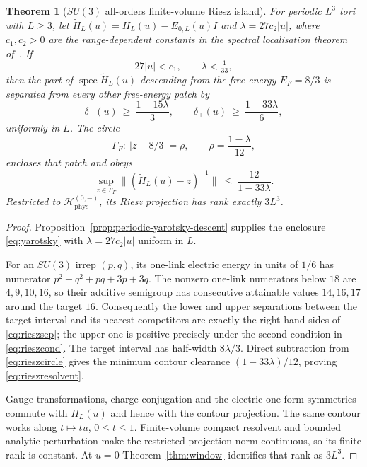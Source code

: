 \documentclass[11pt]{article}
\theoremstyle{plain}
\newtheorem{theorem}{Theorem}
\theoremstyle{definition}
\theoremstyle{remark}
\newcommand{\chk}[1]{}
\begin{document}
\begin{theorem}[$SU(3)$ all-orders finite-volume Riesz island]\label{thm:riesz}\label{thm:riesz-island}
For periodic $L^3$ tori with $L\ge3$, let
$\widetilde H_L(u)=H_L(u)-E_{0,L}(u)I$ and $\lambda=27c_2|u|$, where
$c_1,c_2>0$ are the range-dependent constants in the spectral localisation
theorem of~\cite{Yarotsky2004}. If
\begin{equation}\label{eq:rieszcond}
  27|u|<c_1,\qquad \lambda<\tfrac1{33},
\end{equation}
then the part of $\operatorname{spec}\widetilde H_L(u)$ descending from the
free energy $E_F=8/3$ is separated from every other free-energy patch by
\begin{equation}\label{eq:rieszsep}
  \delta_-(u)\ \ge\ \frac{1-15\lambda}{3},\qquad
  \delta_+(u)\ \ge\ \frac{1-33\lambda}{6},
\end{equation}
uniformly in $L$. The circle
\begin{equation}\label{eq:rieszcircle}
  \Gamma_F:\ |z-8/3|=\rho,\qquad \rho=\frac{1-\lambda}{12},
\end{equation}
encloses that patch and obeys
\begin{equation}\label{eq:rieszresolvent}
  \sup_{z\in\Gamma_F}\bigl\|(\widetilde H_L(u)-z)^{-1}\bigr\|
  \ \le\ \frac{12}{1-33\lambda}.
\end{equation}
Restricted to $\mathcal H^{(0,-)}_{\mathrm{phys}}$, its Riesz projection has
rank exactly $3L^3$.
\end{theorem}

\begin{proof}
Proposition~\ref{prop:periodic-yarotsky-descent} supplies the enclosure
\eqref{eq:yarotsky} with $\lambda=27c_2|u|$ uniform in $L$.

For an $SU(3)$ irrep $(p,q)$, its one-link electric energy in units of $1/6$
has numerator $p^2+q^2+pq+3p+3q$. The nonzero one-link numerators below $18$
are $4,9,10,16$, so their additive semigroup has consecutive attainable values
$14,16,17$ around the target $16$. Consequently the lower and upper
separations between the target interval and its nearest competitors are
exactly the right-hand sides of \eqref{eq:rieszsep}; the upper one is positive
precisely under the second condition in \eqref{eq:rieszcond}. The target
interval has half-width $8\lambda/3$. Direct subtraction from
\eqref{eq:rieszcircle} gives the minimum contour clearance
$(1-33\lambda)/12$, proving \eqref{eq:rieszresolvent}.
\chk{the SU(3) additive electric spectrum leaves 14, 16, 17 around the shell}

Gauge transformations, charge conjugation and the electric one-form
symmetries commute with $H_L(u)$ and hence with the contour projection. The
same contour works along $t\mapsto tu$, $0\le t\le1$. Finite-volume compact
resolvent and bounded analytic perturbation make the restricted projection
norm-continuous, so its finite rank is constant. At $u=0$
Theorem~\ref{thm:window} identifies that rank as $3L^3$.
\end{proof}
\end{document}
